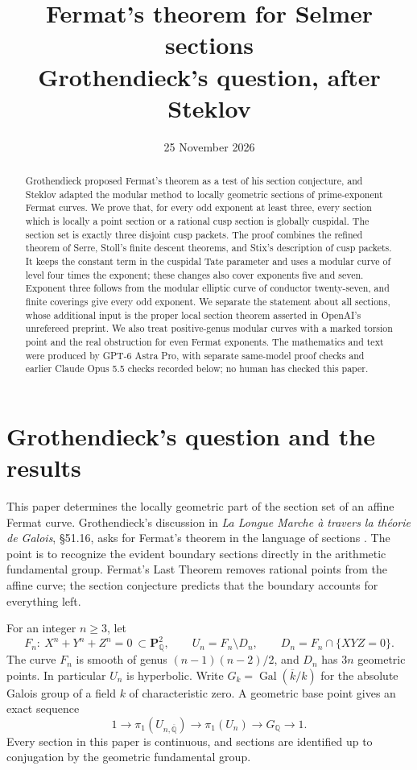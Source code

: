 \documentclass[11pt,a4paper]{article}
\title{Fermat's theorem for Selmer sections\\[4pt]
\large Grothendieck's question, after Steklov}
\author{}
\date{25 November 2026}
\newcommand{\Q}{\mathbb Q}
\newcommand{\Qbar}{\overline{\Q}}
\newcommand{\kbar}{\overline{k}}
\DeclareMathOperator{\Gal}{Gal}
\theoremstyle{plain}
\theoremstyle{definition}
\begin{document}
\maketitle
\begin{abstract}
Grothendieck proposed Fermat's theorem as a test of his section conjecture, and
Steklov adapted the modular method to locally geometric sections of prime-exponent
Fermat curves. We prove that, for every odd exponent at least three, every section
which is locally a point section or a rational cusp section is globally cuspidal.
The section set is exactly three disjoint cusp packets. The proof combines the
refined theorem of Serre, Stoll's finite descent theorems, and Stix's description
of cusp packets. It keeps the constant term in the cuspidal Tate parameter and
uses a modular curve of level four times the exponent; these changes also cover
exponents five and seven. Exponent three follows from the modular elliptic curve
of conductor twenty-seven, and finite coverings give every odd exponent.
We separate the statement about all sections, whose additional input is the
proper local section theorem asserted in OpenAI's unrefereed preprint. We also
treat positive-genus modular curves with a marked torsion point and the real
obstruction for even Fermat exponents. The mathematics and text were produced
by GPT-6 Astra Pro, with separate same-model proof checks and earlier
Claude Opus 5.5 checks recorded below; no human has checked this paper.
\end{abstract}

\section{Grothendieck's question and the results}

This paper determines the locally geometric part of the section set of an
affine Fermat curve. Grothendieck's discussion in
\emph{La Longue Marche \`a travers la th\'eorie de Galois}, \S51.16,
asks for Fermat's theorem in the language of sections
\citep[\S51.16, fols.~733--736v, especially fol.~734]{grothendieck}. The point is to recognize the evident boundary
sections directly in the arithmetic fundamental group. Fermat's Last Theorem
removes rational points from the affine curve; the section conjecture predicts
that the boundary accounts for everything left.

For an integer $n\geq3$, let
\[
 F_n:\ X^n+Y^n+Z^n=0\ \subset\mathbf P^2_{\Q},\qquad
 U_n=F_n\setminus D_n,\qquad D_n=F_n\cap\{XYZ=0\}.
\]
The curve $F_n$ is smooth of genus $(n-1)(n-2)/2$, and $D_n$ has $3n$
geometric points. In particular $U_n$ is hyperbolic. Write
$G_k=\Gal(\kbar/k)$ for the absolute Galois group of a field $k$ of
characteristic zero. A geometric base point gives an exact sequence
\begin{equation}\label{eq:fundamental}
 1\longrightarrow\pi_1(U_{n,\Qbar})\longrightarrow\pi_1(U_n)
 \longrightarrow G_{\Q}\longrightarrow1.
\end{equation}
Every section in this paper is continuous, and sections are identified up to
conjugation by the geometric fundamental group.
\end{document}
